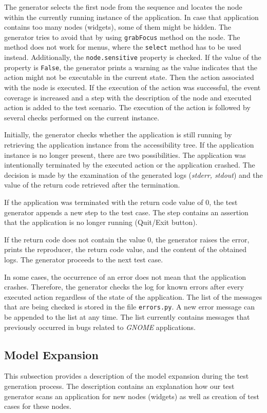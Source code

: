 The generator selects the first node from the sequence and locates the node within the currently running instance of the application. In case that application contains too many nodes (widgets), some of them might be hidden. The generator tries to avoid that by using \texttt{grabFocus} method on the node. The method does not work for menus, where the \texttt{select} method has to be used instead.  Additionally, the \texttt{node.sensitive} property is checked. If the value of the property is \texttt{False}, the generator prints a warning as the value indicates that the action might not be executable in the current state. Then the action associated with the node is executed. If the execution of the action was successful, the event coverage is increased and a step with the description of the node and executed action is added to the test scenario. The execution of the action is followed by several checks performed on the current instance.

Initially, the generator checks whether the application is still running by retrieving the application instance from the accessibility tree. If the application instance is no longer present, there are two possibilities. The application was intentionally terminated by the executed action or the application crashed. The decision is made by the examination of the generated logs (\textit{stderr, stdout}) and the value of the return code retrieved after the termination.

If the application was terminated with the return code value of 0, the test generator appends a new step to the test case. The step contains an assertion that the application is no longer running (Quit/Exit button). 

If the return code does not contain the value 0, the generator raises the error, prints the reproducer, the return code value, and the content of the obtained logs. The generator proceeds to the next test case. 

In some cases, the occurrence of an error does not mean that the application crashes. Therefore, the generator checks the log for known errors after every executed action regardless of the state of the application. The list of the messages that are being checked is stored in the file \texttt{errors.py}. A new error message can be appended to the list at any time. The list currently contains messages that previously occurred in bugs related to \textit{GNOME} applications.

\subsection{Model Expansion}
This subsection provides a description of the model expansion during the test generation process. The description contains an explanation how our test generator scans an application for new nodes (widgets) as well as creation of test cases for these nodes.

